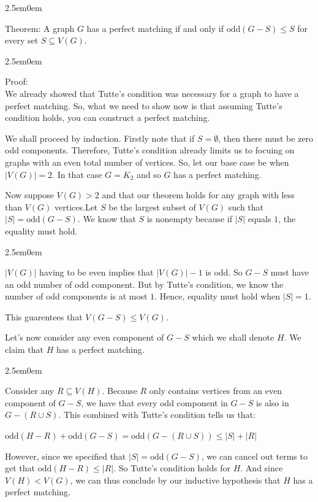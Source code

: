 \documentclass{book}
\newcommand{\hTwo}{%
   \color{MidnightBlue}%
   \fontsize{13}{15}\selectfont%
}
\newcommand{\hThree}{%
   \color{PineGreen}
   \fontsize{13}{15}\selectfont%
}
\newcommand{\hFour}{%
   \color{Cerulean}
   \fontsize{12}{14}\selectfont%
}
\newenvironment{myIndent}{%
   \begin{adjustwidth}{2.5em}{0em}%
}{%
   \end{adjustwidth}%
}
\newcommand{\uuline}[2][.]{%
{\vphantom{a}\color{#1}%
\rlap{\rule[-0.18em]{\widthof{#2}}{0.06em}}%
\rlap{\rule[-0.32em]{\widthof{#2}}{0.06em}}}%
#2}
\newcommand{\oddComp}[1]{\mathrm{odd}(#1)}
\newcommand{\retTwo}{\hfill\bigbreak}
\begin{document}
{\begin{myIndent} \hTwo
   \uuline{Theorem}: A graph $G$ has a perfect matching if and only if $\oddComp{G - S} \leq S$ for every set $S \subseteq V(G)$.

   \begin{myIndent} \hThree
      Proof: \\
      We already showed that Tutte's condition was necessary for a graph to have a perfect matching. So, what we need to show now is that assuming Tutte's condition holds, you can construct a perfect matching. \retTwo

      We shall proceed by induction. Firstly note that if $S = \emptyset$, then there must be zero odd components. Therefore, Tutte's condition already limits us to focuing on graphs with an even total number of vertices. So, let our base case be when $|V(G)| = 2$. In that case   $G = K_2$ and so $G$ has a perfect matching.

      \newpage
      Now suppose $V(G) > 2$ and that our theorem holds for any graph with less than $V(G)$ vertices.\retTwo Let $S$ be the largest subset of $V(G)$ such that $|S| = \oddComp{G - S}$. We know that $S$ is nonempty because if $|S|$ equals $1$, the equality must hold.
      {\begin{myIndent} \hFour
         $|V(G)|$ having to be even implies that $|V(G)| - 1$ is odd. So $G - S$ must have an odd number of odd component. But by Tutte's condition, we know the number of odd components is at most $1$. Hence, equality must hold when $|S| = 1$.
      \end{myIndent}}
      This guarentees that $V(G - S) \leq V(G)$. \retTwo

      Let's now consider any even component of $G - S$ which we shall denote $H$. We claim that $H$ has a perfect matching.
      {\begin{myIndent} \hFour
         Consider any $R \subseteq V(H)$. Because $R$ only contains vertices from an even component of $G - S$, we have that every odd component in $G - S$ is also in $G - (R \cup S)$. This combined with Tutte's condition tells us that:
         
         {\centering $\oddComp{H - R} + \oddComp{G - S} = \oddComp{G - (R \cup S)} \leq |S| + |R|$ \retTwo \par}

         However, since we specified that $|S| = \oddComp{G - S}$, we can cancel out terms to get that $\oddComp{H - R} \leq |R|$. So Tutte's condition holds for $H$. And since $V(H) < V(G)$, we can thus conclude by our inductive hypothesis that $H$ has a perfect matching. \retTwo
      \end{myIndent}}
      

\end{myIndent}
\end{myIndent}}
\end{document}
